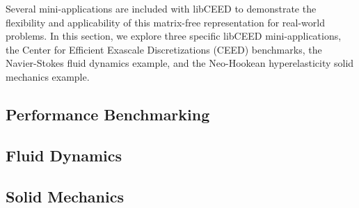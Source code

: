 Several mini-applications are included with libCEED \cite{libceed-user-manual} to demonstrate the flexibility and applicability of this matrix-free representation for real-world problems.
In this section, we explore three specific libCEED mini-applications, the Center for Efficient Exascale Discretizations (CEED) benchmarks, the Navier-Stokes fluid dynamics example, and the Neo-Hookean hyperelasticity solid mechanics example.

\subsection{Performance Benchmarking}\label{sec:app-bench}


\subsection{Fluid Dynamics}\label{sec:app-fluid}


\subsection{Solid Mechanics}\label{sec:app-solid}
